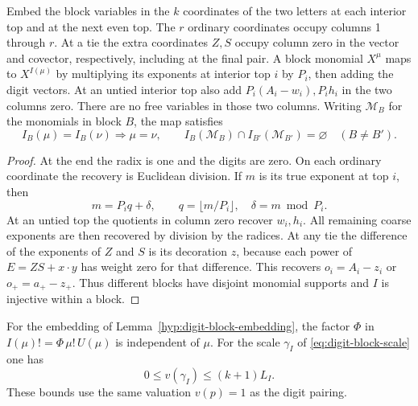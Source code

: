 \begin{established}\label{hyp:digit-block-embedding}
Embed the block variables in the \(k\) coordinates of the
two letters at each interior top and at the next even top.
The \(r\) ordinary coordinates occupy columns 1 through \(r\).
At a tie the extra coordinates \(Z,S\) occupy column zero in
the vector and covector, respectively, including at the final
pair. A block monomial \(X^\mu\) maps to \(X^{I(\mu)}\) by
multiplying its exponents at interior top \(i\) by \(P_i\),
then adding the digit vectors. At an untied interior top also
add \(P_i(A_i-w_i),P_i h_i\) in the two columns zero.
There are no free variables in those two columns.
Writing \(\mathcal M_B\) for the monomials in block \(B\), the map satisfies
\[
 I_B(\mu)=I_B(\nu)\Longrightarrow\mu=\nu,\qquad
 I_B(\mathcal M_B)\cap I_{B'}(\mathcal M_{B'})=\varnothing\quad(B\ne B').
\]
\end{established}
\begin{proof}
At the
end the radix is one and the digits are zero.  On each ordinary coordinate the recovery is Euclidean division. If \(m\) is its true exponent at top \(i\), then
\[
 m=P_i q+\delta,\qquad q=\lfloor m/P_i\rfloor,\quad \delta=m\bmod P_i.
\]
At an untied top the
quotients in column zero recover \(w_i,h_i\). All remaining
coarse exponents are then recovered by division by the radices.
At any tie the difference of the exponents of \(Z\) and \(S\)
is its decoration \(z\), because each power of
\(E=ZS+x\cdot y\) has weight zero for that difference.
This recovers \(o_i=A_i-z_i\) or \(o_+=a_+-z_+\).
Thus different blocks have disjoint monomial supports and
\(I\) is injective within a block.
\end{proof}

\begin{lemma}\label{lem:digit-block-scale}
For the embedding of Lemma~\ref{hyp:digit-block-embedding}, the factor
\(\Phi\) in \(I(\mu)!=\Phi\,\mu!\,U(\mu)\) is independent
of \(\mu\). For the scale \(\gamma_I\) of \eqref{eq:digit-block-scale} one has
\[
 0\le v(\gamma_I)\le(k+1)L_I.
\]
 These bounds use the
same valuation \(v(p)=1\) as the digit pairing.
\end{lemma}

